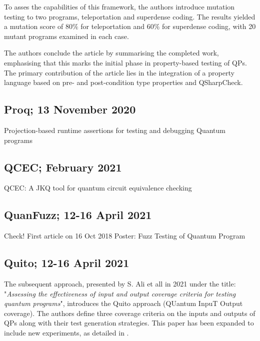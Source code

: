 \begin{itemize}
To asses the capabilities of this framework, the authors introduce mutation testing to two programs, teleportation and superdense coding. The results yielded a mutation score of $80\%$ for teleportation and $60\%$ for superdense coding, with 20 mutant programs examined in each case.\newline

The authors conclude the article by summarising the completed work, emphasising that this marks the initial phase in property-based testing of QPs. The primary contribution of the article lies in the integration of a property language based on pre- and post-condition type properties and QSharpCheck.

\vspace{15pt}
\subsection{Proq; 13 November 2020}

Projection-based runtime assertions for testing and debugging Quantum programs \cite{li2020projection}

\vspace{15pt}
\subsection{QCEC; February 2021}

QCEC: A JKQ tool for quantum circuit equivalence checking 

\vspace{15pt}
\subsection{QuanFuzz; 12-16 April 2021}

Check! First article on 16 Oct 2018 \cite{wang2018quanfuzz}
Poster: Fuzz Testing of Quantum Program 
 \cite{wang2021poster}

\vspace{15pt}
\subsection{Quito; 12-16 April 2021}
\label{Ch3.2.2:Quito}

 The subsequent approach, presented by S. Ali et all in 2021 under the title: "\textit{Assessing the effectiveness of input and output coverage criteria for testing quantum programs}"\cite{ali2021assessing}, introduces the Quito approach (QUantum InpuT Output coverage). The authors define three coverage criteria on the inputs and outputs of QPs along with their test generation strategies. This paper has been expanded to include new experiments, as detailed in \cite{wang2021quito}.\newline


\end{itemize}
